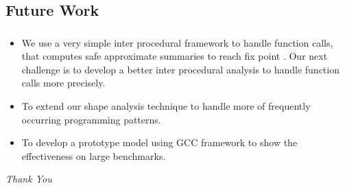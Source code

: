 \documentclass[mathserif,10pt]{beamer}
\begin{document}
\subsection{Future Work}
\frame
{
	\frametitle{\subsecname}
	\begin{itemize}
	\item We use a very simple inter procedural framework to handle
function calls, that computes safe approximate summaries to
reach fix point .  Our next challenge is to develop a better
inter procedural analysis to handle function calls more
precisely. 
	\item To extend our shape analysis
technique to handle more of frequently occurring programming
patterns.
     \item To develop a prototype model using
GCC framework to show the effectiveness on large
benchmarks. 
	\end{itemize}
}

\begin{frame}[plain]

	\begin{center}
	\Huge{\emph{\blue Thank You }}
	\end{center}
\end{frame}
\end{document}
